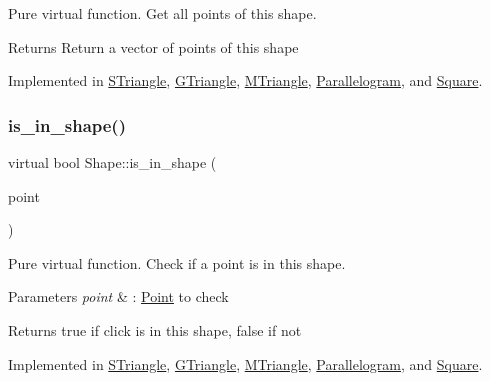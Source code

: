 Pure virtual function. Get all points of this shape. 

\begin{DoxyReturn}{Returns}
Return a vector of points of this shape 
\end{DoxyReturn}


Implemented in \hyperlink{classSTriangle_a08f667453619b506b5c16745a9aa5ecf}{S\+Triangle}, \hyperlink{classGTriangle_add4581d1b52836142de5817de4d52d17}{G\+Triangle}, \hyperlink{classMTriangle_a90351a097a20d35f9d6c4d05ad881e48}{M\+Triangle}, \hyperlink{classParallelogram_a17c9986712806a8b07d90e444e0a543d}{Parallelogram}, and \hyperlink{classSquare_a2a8fb1bfd2f3464cee813ec8b277506e}{Square}.

\mbox{\label{classShape_aa09a621da090e42840b4bec7ffb27620}} 
\subsubsection{\texorpdfstring{is\+\_\+in\+\_\+shape()}{is\_in\_shape()}}
{\footnotesize\ttfamily virtual bool Shape\+::is\+\_\+in\+\_\+shape (\begin{DoxyParamCaption}\item[{const \hyperlink{classPoint}{Point}$<$ double $>$ \&}]{point }\end{DoxyParamCaption})\hspace{0.3cm}{\ttfamily [pure virtual]}}



Pure virtual function. Check if a point is in this shape. 


\begin{DoxyParams}{Parameters}
{\em point} & \+: \hyperlink{classPoint}{Point} to check \\
\hline
\end{DoxyParams}
\begin{DoxyReturn}{Returns}
true if click is in this shape, false if not 
\end{DoxyReturn}


Implemented in \hyperlink{classSTriangle_a5b55df6eb4af922521da69f69df77b42}{S\+Triangle}, \hyperlink{classGTriangle_abb6f7243155483cc6de301931e87475a}{G\+Triangle}, \hyperlink{classMTriangle_a4cc4cd63537ead67a0b68d1ab25111b4}{M\+Triangle}, \hyperlink{classParallelogram_a585b14ca0f65ed3a5007e8c1df3c6bc4}{Parallelogram}, and \hyperlink{classSquare_ada046df2d9fb92286d106d4b3475980a}{Square}.

